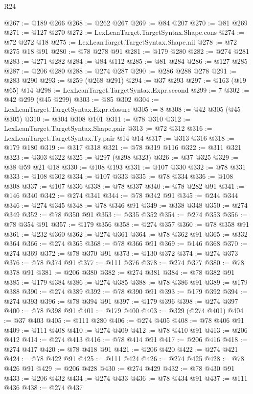 \begin{lexlean}{R24}
\begin{coremodule}
@267 := @189 @266
@268 := @262 @267
@269 := @84 @207
@270 := @81 @269
@271 := @127 @270
@272 := LexLeanTarget.TargetSyntax.Shape.cons
@274 := @72 @272 @18
@275 := LexLeanTarget.TargetSyntax.Shape.nil
@278 := @72 @275 @18 @91
@280 := @78 @278 @91
@281 := @179 @280
@282 := @274 @281
@283 := @271 @282
@284 := @84 @112
@285 := @81 @284
@286 := @127 @285
@287 := @206 @280
@288 := @274 @287
@290 := @286 @288 @278
@291 := @283 @290
@293 := @259 (@268 @291)
@294 := @37 @293
@297 := @163 (@19 @65) @14
@298 := LexLeanTarget.TargetSyntax.Expr.second
@299 := 7
@302 := @42 @299 (@45 @299)
@303 := @85 @302
@304 := LexLeanTarget.TargetSyntax.Expr.closure
@305 := 8
@308 := @42 @305 (@45 @305)
@310 := @304 @308 @101
@311 := @78 @310
@312 := LexLeanTarget.TargetSyntax.Shape.pair
@313 := @72 @312
@316 := LexLeanTarget.TargetSyntax.Ty.pair @14 @14
@317 := @313 @316
@318 := @179 @180
@319 := @317 @318
@321 := @78 @319 @116
@322 := @311 @321
@323 := @303 @322
@325 := @297 (@298 @323)
@326 := @37 @325
@329 := @38 @59 @21 @18
@330 := @108 @193
@331 := @107 @330
@332 := @78 @331
@333 := @108 @302
@334 := @107 @333
@335 := @78 @334
@336 := @108 @308
@337 := @107 @336
@338 := @78 @337
@340 := @78 @282 @91
@341 := @146 @340
@342 := @274 @341
@344 := @78 @342 @91
@345 := @244 @344
@346 := @274 @345
@348 := @78 @346 @91
@349 := @338 @348
@350 := @274 @349
@352 := @78 @350 @91
@353 := @335 @352
@354 := @274 @353
@356 := @78 @354 @91
@357 := @179 @356
@358 := @274 @357
@360 := @78 @358 @91
@361 := @232 @360
@362 := @274 @361
@364 := @78 @362 @91
@365 := @332 @364
@366 := @274 @365
@368 := @78 @366 @91
@369 := @146 @368
@370 := @274 @369
@372 := @78 @370 @91
@373 := @130 @372
@374 := @274 @373
@376 := @78 @374 @91
@377 := @111 @376
@378 := @274 @377
@380 := @78 @378 @91
@381 := @206 @380
@382 := @274 @381
@384 := @78 @382 @91
@385 := @179 @384
@386 := @274 @385
@388 := @78 @386 @91
@389 := @179 @388
@390 := @274 @389
@392 := @78 @390 @91
@393 := @179 @392
@394 := @274 @393
@396 := @78 @394 @91
@397 := @179 @396
@398 := @274 @397
@400 := @78 @398 @91
@401 := @179 @400
@403 := @329 (@274 @401)
@404 := @37 @403
@405 := @111 @280
@406 := @274 @405
@408 := @78 @406 @91
@409 := @111 @408
@410 := @274 @409
@412 := @78 @410 @91
@413 := @206 @412
@414 := @274 @413
@416 := @78 @414 @91
@417 := @206 @416
@418 := @274 @417
@420 := @78 @418 @91
@421 := @206 @420
@422 := @274 @421
@424 := @78 @422 @91
@425 := @111 @424
@426 := @274 @425
@428 := @78 @426 @91
@429 := @206 @428
@430 := @274 @429
@432 := @78 @430 @91
@433 := @206 @432
@434 := @274 @433
@436 := @78 @434 @91
@437 := @111 @436
@438 := @274 @437

\end{coremodule}
\end{lexlean}
